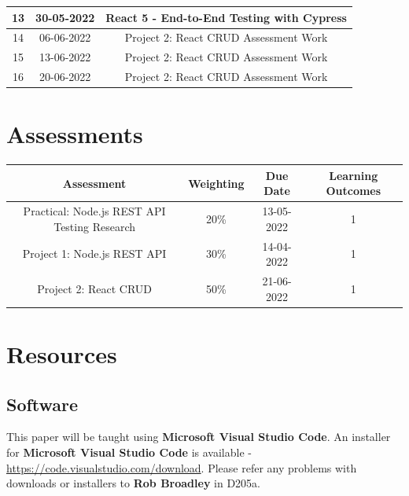 \documentclass{article}
\begin{document}
\begin{tabular}{|c|c|c|c|}
	\footnotesize 13     & \footnotesize 30-05-2022 & \multicolumn{2}{c|}{\footnotesize React 5 - End-to-End Testing with Cypress}     \\ \hline
	\footnotesize 14     & \footnotesize 06-06-2022 & \multicolumn{2}{c|}{\footnotesize Project 2: React CRUD Assessment Work}     \\ \hline
	\footnotesize 15     & \footnotesize 13-06-2022 & \multicolumn{2}{c|}{\footnotesize Project 2: React CRUD Assessment Work}     \\ \hline
	\footnotesize 16     & \footnotesize 20-06-2022 & \multicolumn{2}{c|}{\footnotesize Project 2: React CRUD Assessment Work}     \\ \hline
\end{tabular}

\section*{Assessments}
\renewcommand{\arraystretch}{1.5}
\begin{tabular}{|c|c|c|c|}
	\hline
	\textbf{Assessment}                                & \textbf{Weighting} & \textbf{Due Date} & \textbf{Learning Outcomes} \\ \hline 
	\small Practical: Node.js REST API Testing Research             & \small 20\%        & \small 13-05-2022 & \small 1                   \\ \hline
	\small Project 1: Node.js REST API                 & \small 30\%        & \small 14-04-2022 & \small 1                   \\ \hline
	\small Project 2: React CRUD                       & \small 50\%        & \small 21-06-2022 & \small 1                   \\ \hline 
\end{tabular} 

\section*{Resources}

\subsection*{Software}
This paper will be taught using \textbf{Microsoft Visual Studio Code}. An installer for \textbf{Microsoft Visual Studio Code} is available - \href{https://code.visualstudio.com/download}{https://code.visualstudio.com/download}. Please refer any problems with downloads or installers to \textbf{Rob Broadley} in D205a.
\end{document}
